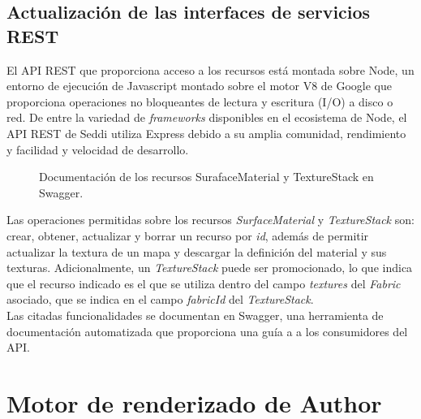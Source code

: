 \subsection{Actualizaci\'on de las interfaces de servicios REST}
El API REST que proporciona acceso a los recursos est\'a montada sobre Node, un entorno de ejecuci\'on de Javascript montado
sobre el motor V8 de Google que proporciona operaciones no bloqueantes de lectura y escritura (I/O) a disco o red.
De entre la variedad de \textit{frameworks} disponibles en el ecosistema de Node, el API REST de Seddi utiliza Express debido
a su amplia comunidad, rendimiento y facilidad y velocidad de desarrollo.\\

\begin{figure}[H]
  \vspace{0.5cm}
  \centering
  \caption{Documentaci\'on de los recursos SurafaceMaterial y TextureStack en Swagger.}
  \vspace{0.5cm}
\end{figure}

Las operaciones permitidas sobre los recursos \textit{SurfaceMaterial} y \textit{TextureStack} son: crear, obtener, actualizar y borrar
un recurso por \textit{id}, adem\'as de permitir actualizar la textura de un mapa y descargar la definici\'on del material
y sus texturas. Adicionalmente, un \textit{TextureStack} puede ser promocionado, lo que indica que el recurso indicado
es el que se utiliza dentro del campo \textit{textures} del \textit{Fabric} asociado, que se indica en el campo \textit{fabricId} del
\textit{TextureStack}.\\

Las citadas funcionalidades se documentan en Swagger, una herramienta de documentaci\'on automatizada que proporciona una gu\'ia a
a los consumidores del API.







\section{Motor de renderizado de Author}

